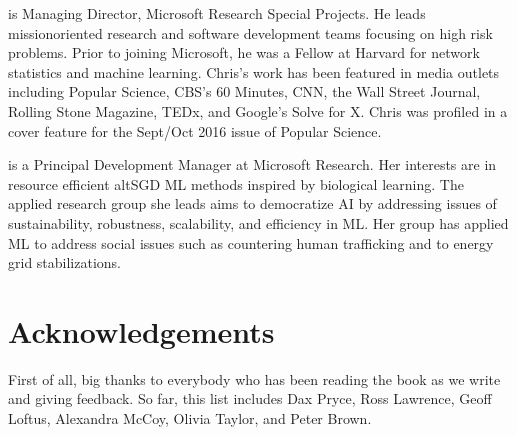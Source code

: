 \documentclass[letterpaper,10pt,english]{jupyterBook}
\begin{document}
\sphinxAtStartPar
{} is Managing Director, Microsoft Research Special Projects. He leads mission\sphinxhyphen{}oriented research and software development teams focusing on high risk problems. Prior to joining Microsoft, he was a Fellow at Harvard for network statistics and machine learning. Chris’s work has been featured in media outlets including Popular Science, CBS’s 60 Minutes, CNN, the Wall Street Journal, Rolling Stone Magazine, TEDx, and Google’s Solve for X. Chris was profiled in a cover feature for the Sept/Oct 2016 issue of Popular Science.

\sphinxAtStartPar
{} is a Principal Development Manager at Microsoft Research. Her interests are in resource efficient alt\sphinxhyphen{}SGD ML methods inspired by biological learning. The applied research group she leads aims to democratize AI by addressing issues of sustainability, robustness, scalability, and efficiency in ML. Her group has applied ML to address social issues such as countering human trafficking and to energy grid stabilizations.


\section{Acknowledgements}
\label{\detokenize{introduction/preface:acknowledgements}}
\sphinxAtStartPar
First of all, big thanks to everybody who has been reading the book as we write and giving feedback. So far, this list includes Dax Pryce, Ross Lawrence, Geoff Loftus, Alexandra McCoy, Olivia Taylor, and Peter Brown.
\end{document}

